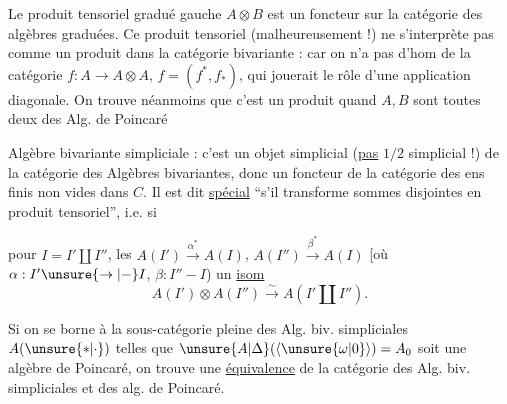 
Le produit tensoriel gradué gauche $A\otimes B$ est un foncteur sur la catégorie  des algèbres graduées. Ce produit tensoriel (malheureusement !) ne s'interprète pas comme un produit dans la catégorie bivariante : car on n'a pas d'hom de la catégorie $f:A\to A\otimes A$, $f=(f^*,f_*)$, qui jouerait le rôle d'une application diagonale. On trouve néanmoins que c'est un produit  quand $A,B$ sont toutes deux des Alg. de Poincaré\unsure{\ldots}

Algèbre bivariante simpliciale : c'est un objet simplicial (\uline{pas} \uline{$1/2$} simplicial !) de la catégorie des Algèbres bivariantes, donc un foncteur  de la catégorie des ens finis non vides dans $C$. Il est dit \uline{spécial} ``s'il transforme sommes disjointes en produit tensoriel'', i.e. si

pour $I=I'\amalg I''$, les 
$A(I')\xrightarrow{\alpha^*}A(I)$, $A(I'')\xrightarrow{\beta^*}A(I)$
[où $\alpha:I'\unsure{\to|-}I$, $\beta:I''-I$)  un \uline{isom}
\[
A(I')\otimes A(I'')\xrightarrow{\sim}A(I'\amalg I'').
\]

Si  on se borne à la sous-catégorie pleine des Alg. biv. simpliciales $A(\unsure{*|\cdot})$ telles que $\unsure{A|\Delta}(\langle\unsure{\omega|0}\rangle)=A_0$ soit une algèbre de Poincaré, on trouve une \uline{équivalence} de la catégorie des Alg. biv. simpliciales et des alg. de Poincaré.

